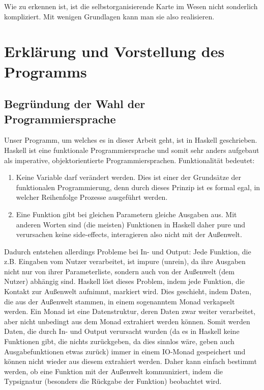 \documentclass[twoside,a4paper]{article}
\begin{document}
Wie zu erkennen ist, ist die selbstorganisierende Karte im Wesen nicht sonderlich kompliziert. Mit wenigen Grundlagen kann man sie also realisieren.

\section{Erklärung und Vorstellung des Programms}

\subsection{Begründung der Wahl der Programmiersprache}

Unser Programm, um welches es in dieser Arbeit geht, ist in Haskell geschrieben. Haskell ist eine funktionale Programmiersprache und somit sehr anders aufgebaut als imperative, objektorientierte Programmiersprachen. Funktionalität bedeutet:

\begin{enumerate}
\item Keine Variable darf verändert werden. Dies ist einer der Grundsätze der funktionalen Programmierung, denn durch dieses Prinzip ist es formal egal, in welcher Reihenfolge Prozesse ausgeführt werden.

\item Eine Funktion gibt bei gleichen Parametern gleiche Ausgaben aus. Mit anderen Worten sind (die meisten) Funktionen in Haskell daher \glqq{}pure\grqq{} und verursachen keine \glqq{}side-effects\grqq{}, interagieren also nicht mit der Außenwelt.
\end{enumerate}

Dadurch entstehen allerdings Probleme bei In- und Output: Jede Funktion, die z.B. Eingaben vom Nutzer verarbeitet, ist \glqq{}impure\grqq{} (unrein), da ihre Ausgaben nicht nur von ihrer Parameterliste, sondern auch von der Außenwelt (dem Nutzer) abhängig sind. Haskell löst dieses Problem, indem jede Funktion, die Kontakt zur Außenwelt aufnimmt, markiert wird. Dies geschieht, indem Daten, die aus der Außenwelt stammen, in einem sogenanntem \glqq{}Monad\grqq{} verkapselt werden. Ein Monad ist eine Datenstruktur, deren Daten zwar weiter verarbeitet, aber nicht unbedingt aus dem Monad extrahiert werden können. Somit werden Daten, die durch In- und Output verursacht wurden (da es in Haskell keine Funktionen gibt, die nichts zurückgeben, da dies sinnlos wäre, geben auch Ausgabefunktionen etwas zurück) immer in einem \glqq{}IO-Monad\grqq{} gespeichert und können nicht wieder aus diesem extrahiert werden. Daher kann einfach bestimmt werden, ob eine Funktion mit der Außenwelt kommuniziert, indem die Typsignatur (besonders die Rückgabe der Funktion) beobachtet wird.
\end{document}
